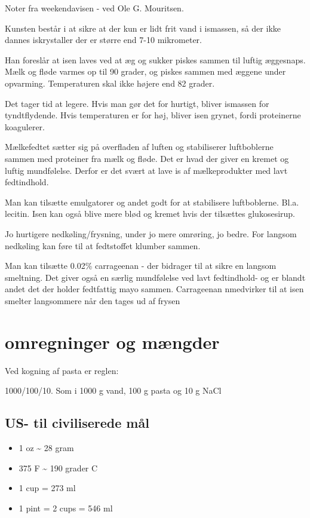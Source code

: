 \documentclass[
  letterpaper,
  DIV=11,
  numbers=noendperiod]{scrreprt}
\providecommand{\tightlist}{%
  \setlength{\itemsep}{0pt}\setlength{\parskip}{0pt}}\usepackage{longtable,booktabs,array}
\begin{document}
Noter fra weekendavisen - ved Ole G. Mouritsen.

Kunsten består i at sikre at der kun er lidt frit vand i ismassen, så
der ikke dannes iskrystaller der er større end 7-10 mikrometer.

Han foreslår at isen laves ved at æg og sukker piskes sammen til luftig
æggesnaps. Mælk og fløde varmes op til 90 grader, og piskes sammen med
æggene under opvarming. Temperaturen skal ikke højere end 82 grader.

Det tager tid at legere. Hvis man gør det for hurtigt, bliver ismassen
for tyndtflydende. Hvis temperaturen er for høj, bliver isen grynet,
fordi proteinerne koagulerer.

Mælkefedtet sætter sig på overfladen af luften og stabiliserer
luftboblerne sammen med proteiner fra mælk og fløde. Det er hvad der
giver en kremet og luftig mundfølelse. Derfor er det svært at lave is af
mælkeprodukter med lavt fedtindhold.

Man kan tilsætte emulgatorer og andet godt for at stabilisere
luftboblerne. Bl.a. lecitin. Isen kan også blive mere blød og kremet
hvis der tilsættes glukosesirup.

Jo hurtigere nedkøling/frysning, under jo mere omrøring, jo bedre. For
langsom nedkøling kan føre til at fedtstoffet klumber sammen.

Man kan tilsætte 0.02\% carrageenan - der bidrager til at sikre en
langsom smeltning. Det giver også en særlig mundfølelse ved lavt
fedtindhold- og er blandt andet det der holder fedtfattig mayo sammen.
Carrageenan nmedvirker til at isen smelter langsommere når den tages ud
af frysen


\hypertarget{omregninger-og-muxe6ngder}{%
\chapter{omregninger og mængder}\label{omregninger-og-muxe6ngder}}

Ved kogning af pasta er reglen:

1000/100/10. Som i 1000 g vand, 100 g pasta og 10 g NaCl

\hypertarget{us--til-civiliserede-muxe5l}{%
\section{US- til civiliserede mål}\label{us--til-civiliserede-muxe5l}}

\begin{itemize}
\tightlist
\item
  1 oz \textasciitilde{} 28 gram
\item
  375 F \textasciitilde{} 190 grader C
\item
  1 cup = 273 ml
\item
  1 pint = 2 cups = 546 ml
\end{itemize}
\end{document}
